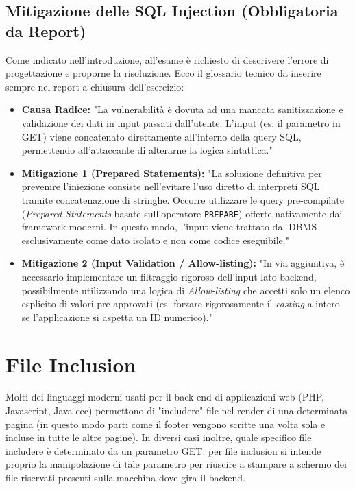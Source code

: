 \documentclass[12pt,a4paper]{report}
\begin{document}
	\subsection{Mitigazione delle SQL Injection (Obbligatoria da Report)}
	Come indicato nell'introduzione, all'esame è richiesto di descrivere l'errore di progettazione e proporne la risoluzione. Ecco il glossario tecnico da inserire sempre nel report a chiusura dell'esercizio:
	\begin{itemize}
		\item \textbf{Causa Radice:} "La vulnerabilità è dovuta ad una mancata sanitizzazione e validazione dei dati in input passati dall'utente. L'input (es. il parametro in GET) viene concatenato direttamente all'interno della query SQL, permettendo all'attaccante di alterarne la logica sintattica."
		\item \textbf{Mitigazione 1 (Prepared Statements):} "La soluzione definitiva per prevenire l'iniezione consiste nell'evitare l'uso diretto di interpreti SQL tramite concatenazione di stringhe. Occorre utilizzare le query pre-compilate (\textit{Prepared Statements} basate sull'operatore \texttt{PREPARE}) offerte nativamente dai framework moderni. In questo modo, l'input viene trattato dal DBMS esclusivamente come dato isolato e non come codice eseguibile."
		\item \textbf{Mitigazione 2 (Input Validation / Allow-listing):} "In via aggiuntiva, è necessario implementare un filtraggio rigoroso dell'input lato backend, possibilmente utilizzando una logica di \textit{Allow-listing} che accetti solo un elenco esplicito di valori pre-approvati (es. forzare rigorosamente il \textit{casting} a intero se l'applicazione si aspetta un ID numerico)."
	\end{itemize}
	
	\section{File Inclusion}
	
	Molti dei linguaggi moderni usati per il back-end di applicazioni web (PHP, Javascript, Java ecc) permettono di "includere" file nel render di una determinata pagina (in questo modo parti come il footer vengono scritte una volta sola e incluse in tutte le altre pagine). In diversi casi inoltre, quale specifico file includere è determinato da un parametro GET: per file inclusion si intende proprio la manipolazione di tale parametro per riuscire a stampare a schermo dei file riservati presenti sulla macchina dove gira il backend.
	
\end{document}
